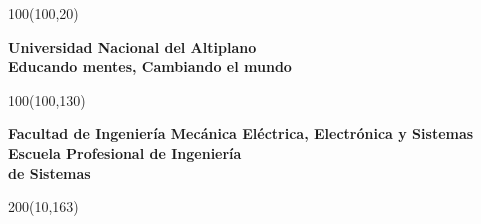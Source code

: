 

\begin{titlepage}
    
    

    \begin{textblock}{100}(100,20)
        \begin{flushright}
        {\huge{\textbf{Universidad Nacional del Altiplano}}}\\
        {\normalsize{\textbf{Educando mentes, Cambiando el mundo}}}
        \end{flushright}
        
    \end{textblock}
    
    \begin{textblock}{100}(100,130)
        \begin{flushright}
            {\Large{\textbf{Facultad de Ingeniería Mecánica Eléctrica,
                    Electrónica y Sistemas}}}\\[10pt]
            {\large{\textbf{Escuela Profesional de Ingeniería\\ de Sistemas}}}
        \end{flushright}
    \end{textblock}

    \begin{textblock}{200}(10,163)
        \begin{center}
            

\end{center}
\end{textblock}
\end{titlepage}
